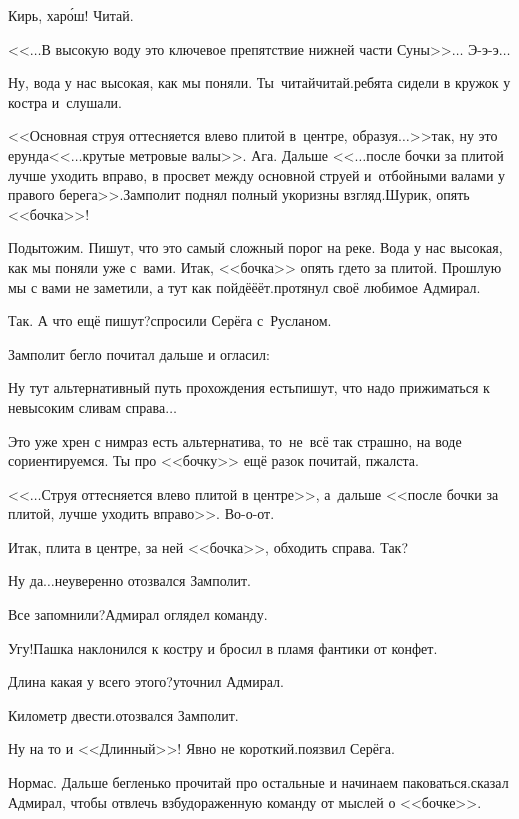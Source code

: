 \diagdash Кирь, хар\'ош! Читай.

\diagdash <<$\ldots$В высокую воду это ключевое препятствие нижней части Суны>>$\ldots$ Э-э-э$\ldots$ %

\diagdash Ну, вода у нас высокая, как мы поняли. Ты~читай\sdash читай.\mdash ребята сидели в кружок у костра и~слушали.

\diagdash <<Основная струя оттесняется влево плитой в~центре, образуя$\ldots$>>\mdash так, ну это ерунда\mdash <<$\ldots$крутые метровые валы>>. Ага. Дальше <<$\ldots$после бочки за плитой лучше уходить вправо, в просвет между основной струей и~отбойными валами у правого берега>>.\mdash Замполит поднял полный укоризны взгляд.\mdash Шурик, опять <<бочка>>!

\diagdash Подытожим. Пишут, что это самый сложный порог на реке. Вода у нас высокая, как мы поняли уже с~вами. Итак, <<бочка>> опять где\sdash то за плитой. Прошлую мы с вами не заметили, а тут как пойдё\sdash ё\sdash ёт.\mdash протянул своё любимое Адмирал.

\diagdash Так. А что ещё пишут?\mdash спросили Серёга с~Русланом.

Замполит бегло почитал дальше и огласил:

\diagdash Ну тут альтернативный путь прохождения есть\mdash пишут, что надо прижиматься к невысоким сливам справа$\ldots$

\diagdash Это уже хрен с ним\mdash раз есть альтернатива, то~не~всё так страшно, на воде сориентируемся. Ты про <<бочку>> ещё разок почитай, п\sdash жалста.

\diagdash <<$\ldots$Струя оттесняется влево плитой в центре>>, а~дальше <<после бочки за плитой, лучше уходить вправо>>. Во-о-от.

\diagdash Итак, плита в центре, за ней <<бочка>>, обходить справа. Так?

\diagdash Ну да$\ldots$\mdash неуверенно отозвался Замполит.

\diagdash Все запомнили?\mdash Адмирал оглядел команду.

\diagdash Угу!\mdash Пашка наклонился к костру и бросил в пламя фантики от конфет.

\diagdash Длина какая у всего этого?\mdash уточнил Адмирал.

\diagdash Километр двести.\mdash отозвался Замполит.

\diagdash Ну на то и <<Длинный>>! Явно не короткий.\mdash поязвил Серёга.

\diagdash Нормас. Дальше бегленько прочитай про остальные и начинаем паковаться.\mdash сказал Адмирал, чтобы отвлечь взбудораженную команду от мыслей о <<бочке>>.

